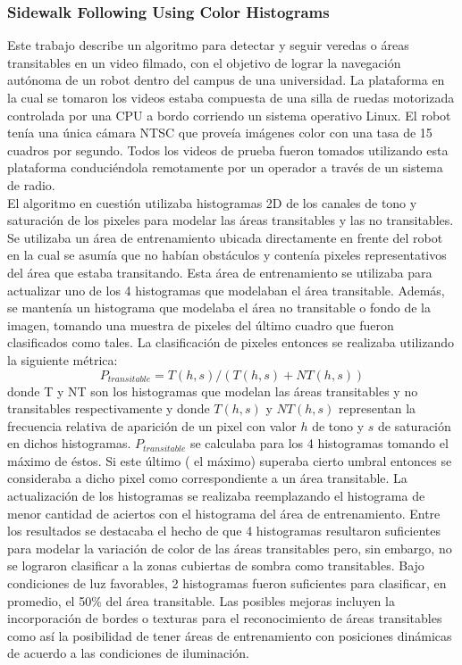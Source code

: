 	\subsubsection{\label{sec:sidewalk} Sidewalk Following Using Color Histograms \cite{sidewalk2008}}
	Este trabajo describe un algoritmo  para detectar y seguir 
	veredas o \'areas transitables en un video filmado, con el objetivo de 
	lograr la navegaci\'on aut\'onoma de un robot dentro del 
	campus de una universidad. La plataforma en la cual se tomaron los 
	videos estaba 
	compuesta de una silla de ruedas motorizada controlada por una CPU 
	a bordo corriendo un sistema operativo Linux. El robot ten\'ia una 
	\'unica c\'amara NTSC que prove\'ia im\'agenes color con una tasa de 15 
	cuadros por segundo. Todos los videos de prueba fueron tomados 
	utilizando esta plataforma conduci\'endola remotamente por un 
	operador a trav\'es de un sistema de radio.\\
	\indent El algoritmo en cuesti\'on utilizaba histogramas 2D de los 
	canales de tono y saturaci\'on de los pixeles para modelar las \'areas
	transitables y las no transitables. Se utilizaba un \'area de  
	entrenamiento ubicada directamente en frente del robot en la cual se 
	asum\'ia que 
	no hab\'ian obst\'aculos y conten\'ia pixeles representativos del \'area que 
	estaba transitando. Esta \'area de entrenamiento se utilizaba para 
	actualizar uno de los 4 histogramas que modelaban el \'area 
	transitable. Adem\'as, se manten\'ia un histograma que modelaba el
	\'area no transitable o fondo de la imagen, tomando una muestra de pixeles del \'ultimo 
	cuadro que fueron clasificados como tales. La 
	clasificaci\'on de pixeles entonces se realizaba utilizando la 
	siguiente m\'etrica:
	\[
	P_{transitable}= T(h,s)/ ( T(h,s) + NT(h,s))
	\]
	donde T y NT son los histogramas que modelan las \'areas transitables
	y no transitables respectivamente y donde $T(h,s)$ y $NT(h,s)$ representan la frecuencia relativa de aparición de un
	pixel con valor $h$ de tono y $s$ de saturación en dichos histogramas. $P_{transitable}$ se calculaba para 
	los 4 histogramas tomando el m\'aximo de \'estos. Si este \'ultimo ( el 
	m\'aximo) superaba 
	cierto umbral entonces se consideraba a dicho pixel como 
	correspondiente a un \'area transitable.
	La actualizaci\'on de los histogramas se realizaba reemplazando el 
	histograma de menor cantidad de aciertos con el histograma 
	del \'area de entrenamiento.  Entre los resultados se destacaba el 
	hecho de que 4 histogramas resultaron suficientes para modelar la
	variaci\'on de color de las \'areas transitables pero, sin embargo, no 
	se lograron clasificar a la zonas cubiertas de sombra como transitables.
	Bajo condiciones de luz favorables, 2 histogramas fueron 
	suficientes para clasificar, en promedio, el 50\% del \'area 
	transitable. Las posibles mejoras incluyen la incorporaci\'on de 
	bordes o texturas para el reconocimiento de \'areas transitables 
	como as\'i la posibilidad de tener \'areas de entrenamiento con 
	posiciones din\'amicas de acuerdo a las condiciones de iluminaci\'on.
	
